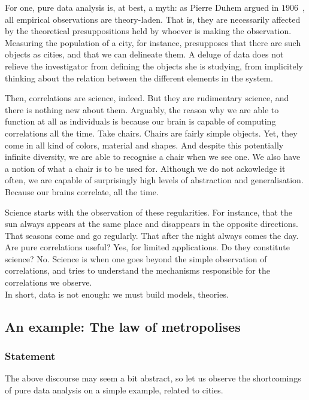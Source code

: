 For one, pure data analysis is, at best, a myth: as Pierre Duhem argued in
$1906$~\cite{Duhem:1997}, all empirical observations are theory-laden. That is,
they are necessarily affected by the theoretical presuppositions held by whoever
is making the observation. Measuring the population of a city, for instance,
presupposes that there are such objects as cities, and that we can delineate
them. A deluge of data does not relieve the investigator from defining the
objects she is studying, from implicitely thinking about the relation between
the different elements in the system.

Then, correlations are science, indeed. But they are rudimentary science, and
there is nothing new about them. Arguably, the reason why we are able to
function at all as individuals is because our brain is capable of computing
correlations all the time. Take chairs. Chairs are fairly simple objects. Yet,
they come in all kind of colors, material and shapes. And despite this
potentially infinite diversity, we are able to recognise a chair when we see
one. We also have a notion of what a chair is to be used for. Although we do not
ackowledge it often, we are capable of surprisingly high levels of abstraction
and generalisation. Because our brains correlate, all the time. 

Science starts with the observation of these regularities. For instance, that
the sun always appears at the same place and disappears in the opposite
directions. That seasons come and go regularly. That after the night always
comes the day. Are pure correlations useful? Yes, for limited applications. Do
they constitute science? No. Science is when one goes beyond the simple
observation of correlations, and tries to understand the mechanisms responsible
for the correlations we observe.\\

In short, data is not enough: we must build models, theories.


\subsection{An example: The law of metropolises}
\label{sec:an_example_the_law_of_metropolises}

\subsubsection{Statement}
\label{sub:statement}

The above discourse may seem a bit abstract, so let us observe the shortcomings
of pure data analysis on a simple example, related to cities.

